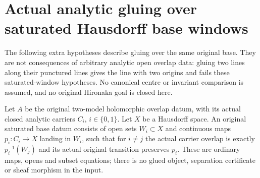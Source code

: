 \section{Actual analytic gluing over saturated Hausdorff base windows}

The following extra hypotheses describe gluing over the same original base.
They are not consequences of arbitrary analytic open overlap data: gluing two
lines along their punctured lines gives the line with two origins and fails
these saturated-window hypotheses. No canonical centre or invariant comparison
is assumed, and no original Hironaka goal is closed here.

\begin{definition}
\label{hir:disjoint-analytic-saturated-base-windows}
\leanok
Let $A$ be the original two-model holomorphic overlap datum, with its actual
closed analytic carriers $C_i$, $i\in\{0,1\}$. Let $X$ be a Hausdorff space.
An original saturated base datum consists of open sets $W_i\subset X$ and
continuous maps $p_i:C_i\to X$ landing in $W_i$, such that for $i\ne j$ the
actual carrier overlap is exactly $p_i^{-1}(W_j)$ and its actual original
transition preserves $p_i$. These are ordinary maps, opens and subset equations;
there is no glued object, separation certificate or sheaf morphism in the input.
\end{definition}

